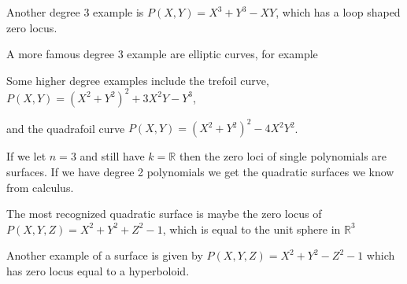 \begin{example}
Another degree 3 example is $P(X, Y) = X^3+Y^3 - XY$, which has a loop shaped zero locus. 
\begin{center}
\def\svgwidth{0.4\textwidth}

\end{center}
\end{example}

\begin{example}
A more famous degree 3 example are elliptic curves, for example
\begin{center}
\def\svgwidth{0.4\textwidth}

\end{center}
\end{example}

\begin{example}
Some higher degree examples include the trefoil curve, $P(X,Y)=(X^2+Y^2)^2 + 3X^2Y-Y^3$, 
\begin{center}
\def\svgwidth{0.4\textwidth}

\end{center}
    
and the quadrafoil curve $P(X, Y) = (X^2+Y^2)^2-4X^2Y^2$.
\begin{center}
\def\svgwidth{0.4\textwidth}

\end{center}
\end{example}

If we let $n=3$ and still have $k=\mathbb{R}$ then the zero loci of single polynomials are surfaces. If we have degree 2 polynomials we get the quadratic surfaces we know from calculus. 

\begin{example}
The most recognized quadratic surface is maybe the zero locus of $P(X, Y, Z) = X^2+Y^2+Z^2-1$, which is equal to the unit sphere in $\mathbb{R}^3$
\begin{center}
\def\svgwidth{0.4\textwidth}

\end{center}
\end{example}

\begin{example}
Another example of a surface is given by $P(X, Y, Z) = X^2+Y^2-Z^2-1$ which has zero locus equal to a hyperboloid.
\begin{center}
\def\svgwidth{0.4\textwidth}

\end{center}
\end{example}

